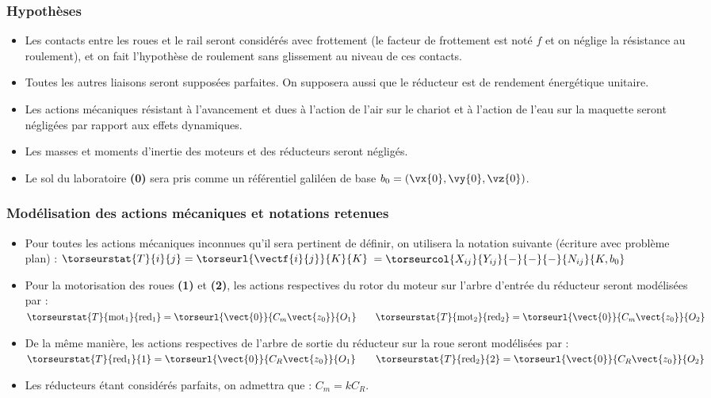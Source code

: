 \subsubsection*{Hypothèses}
\begin{itemize}
    \item Les contacts entre les roues et le rail seront considérés avec frottement (le facteur de frottement est noté $f$ et on néglige la résistance au roulement), et on fait l'hypothèse de roulement sans glissement au niveau de ces contacts.
    \item Toutes les autres liaisons seront supposées parfaites. On supposera aussi que le réducteur est de rendement énergétique unitaire.
    \item Les actions mécaniques résistant à l'avancement et dues à l'action de l'air sur le chariot et à l'action de l'eau sur la maquette seront négligées par rapport aux effets dynamiques.
    \item Les masses et moments d’inertie des moteurs et des réducteurs seront négligés.
    \item Le sol du laboratoire \textbf{(0)} sera pris comme un référentiel galiléen de base $b_0=\left(\vx{0},\vy{0},\vz{0}\right)$.
\end{itemize}
\subsubsection*{Modélisation des actions mécaniques et notations retenues}
\begin{itemize}
    \item Pour toutes les actions mécaniques inconnues qu'il sera pertinent de définir, on utilisera la notation suivante (écriture avec problème plan) :
	$\torseurstat{T}{i}{j}=\torseurl{\vectf{i}{j}}{K}{K}$ $=\torseurcol{X_{ij}}{Y_{ij}}{-}{-}{-}{N_{ij}}{K,b_0}$

    \item Pour la motorisation des roues \textbf{(1)} et \textbf{(2)}, les actions respectives du rotor du moteur sur l’arbre d’entrée du réducteur seront modélisées par :
    $\torseurstat{T}{\text{mot}_1}{\text{red}_1}=\torseurl{\vect{0}}{C_m\vect{z_0}}{O_1} 
    \quad \quad
    \torseurstat{T}{\text{mot}_2}{\text{red}_2}=\torseurl{\vect{0}}{C_m\vect{z_0}}{O_2}$
    \item De la même manière, les actions respectives de l’arbre de sortie du réducteur sur la roue seront modélisées par :
    $\torseurstat{T}{\text{red}_1}{1}=\torseurl{\vect{0}}{C_R\vect{z_0}}{O_1} 
    \quad \quad
    \torseurstat{T}{\text{red}_2}{2}=\torseurl{\vect{0}}{C_R\vect{z_0}}{O_2}$
    \item Les réducteurs étant considérés parfaits, on admettra que :	 $C_m = k C_R$.
\end{itemize}


